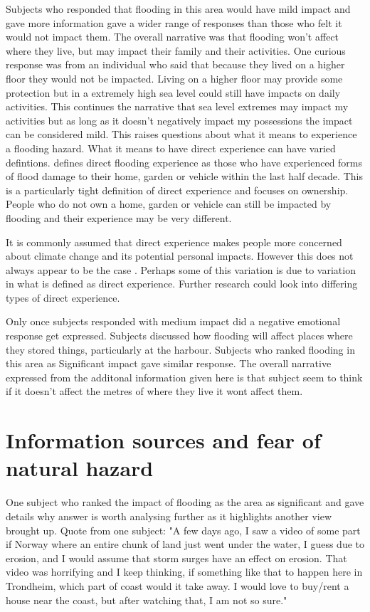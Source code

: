 Subjects who responded that flooding in this area would have mild impact and gave more information gave a wider range of responses than those who felt it would not impact them. The overall narrative was that flooding won’t affect where they live, but may impact their family and their activities. One curious response was from an individual who said that because they lived on a higher floor they would not be impacted. Living on a higher floor may provide some protection but in a extremely high sea level could still have impacts on daily activities. This continues the narrative that sea level extremes may impact my activities but as long as it doesn't negatively impact my possessions the impact can be considered mild. This raises questions about what it means to experience a flooding hazard. What it means to have direct experience can have varied defintions. 
\cite{whitmarsh_are_2008} defines direct flooding experience as those who have experienced forms of flood damage to their home, garden or vehicle within the last half decade. This is a particularly tight definition of direct experience and focuses on ownership. People who do not own a home, garden or vehicle can still be impacted by flooding and their experience may be very different.  

It is commonly assumed that direct experience makes people more concerned about climate change and its potential personal impacts\cite{lujala_role_2020}. However this does not always appear to be the case \cite{lujala_role_2020}. Perhaps some of this variation is due to variation in what is defined as direct experience. Further research could look into differing types of direct experience. 

Only once subjects responded with medium impact did a negative emotional response get expressed. Subjects discussed how flooding will affect places where they stored things, particularly at the harbour. Subjects who ranked flooding in this area as Significant impact gave similar response. The overall narrative expressed from the additonal information given here is that subject seem to think if it doesn’t affect the metres of where they live it wont affect them. 

\section{Information sources and fear of natural hazard }

One subject who ranked the impact of flooding as the area as significant and gave details why answer is worth analysing further as it highlights another view brought up. 
Quote from one subject: 
"A few days ago, I saw a video of some part if Norway where an entire chunk of land just went under the water, I guess due to erosion, and I would assume that storm surges have an effect on erosion. That video was horrifying and I keep thinking, if something like that to happen here in Trondheim, which part of coast would it take away. I would love to buy/rent a house near the coast, but after watching that, I am not so sure."


